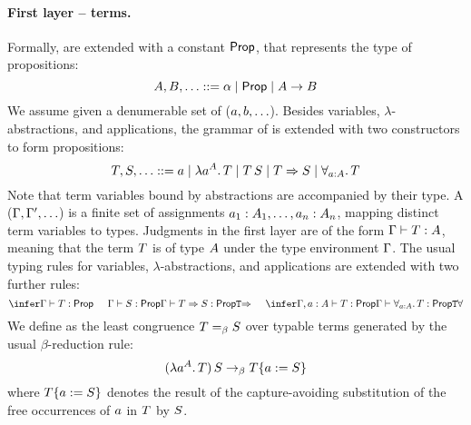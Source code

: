 \paragraph{First layer -- terms.}
Formally,  are extended with a constant $\mathsf{Prop}$,
that represents the type of propositions:
\[
  A,B,\hdots ::= \alpha \mid \mathsf{Prop} \mid A\to B
\]
We assume given a denumerable set of  ($a,b,\hdots$).
Besides variables, $\lambda$-abstractions, and applications,
the grammar of  is extended with two constructors to form propositions:
\[
  T, S, \hdots ::= a
                       \mid \lambda{a^A}.\,T
                       \mid T\,S
                       \mid T\Rightarrow S
                       \mid \forall_{a:A}.\,T
\]
Note that term variables bound by abstractions are accompanied by their type.
A  ($\Gamma,\Gamma',\hdots$)
is a finite set of assignments
$a_1:A_1,\hdots,a_n:A_n$, mapping distinct term variables to types.
Judgments in the first layer are of the form $\Gamma\vdash T:A$,
meaning that the term $T$ is of type $A$ under the type environment $\Gamma$.
The usual typing rules for variables, $\lambda$-abstractions, and applications
are extended with two further rules:
\[
  \indrule{\ruleTImp}{
    \tjudg{\tenv}{\ttm}{\Prop}
    \HS
    \tjudg{\tenv}{\ttmtwo}{\Prop}
  }{
    \tjudg{\tenv}{\ttm\imp\ttmtwo}{\Prop}
  }
  \HS
  \indrule{\ruleTAll}{
    \tjudg{\tenv,\tvar:\typ}{\ttm}{\Prop}
  }{
    \tjudg{\tenv}{\all{\tvar}{\typ}{\ttm}}{\Prop}
  }
\]
We define  as the least congruence
$T \mathrel{=_\beta} S$ over typable terms generated by the usual
$\beta$-reduction rule:
\[
  (\lambda{a^A}.\,T)\,S
  \mathrel{\to_\beta}
  T\{a:=S\}
\]
where $T\{a:=S\}$ denotes the result of the capture-avoiding
substitution of the free occurrences of $a$ in $T$ by $S$.

